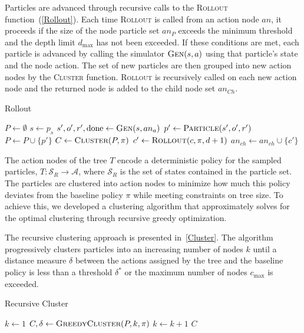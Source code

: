 \documentclass[letterpaper]{article} %
\begin{document}
Particles are advanced through recursive calls to the \textsc{Rollout} function~(\cref{Rollout}).
Each time \textsc{Rollout} is called from an action node $an$, it proceeds if the size of the node particle set $an_P$ exceeds the minimum threshold and the depth limit $d_{\max}$ has not been exceeded.
If these conditions are met, each particle is advanced by calling the simulator $\textsc{Gen}(s, a)$ using that particle's state and the node action.
The set of new particles are then grouped into new action nodes by the \textsc{Cluster} function.
\textsc{Rollout} is recursively called on each new action node and the returned node is added to the child node set $an_{Ch}$.
\begin{algorithm}[ht]
\caption{Rollout}\label{Rollout}
\begin{algorithmic}[1]
\State $P \gets \emptyset$
\State $s \gets p_s$
\State $s', o', r', \text{done} \gets \textsc{Gen}(s, an_a)$
\State $p' \gets \textsc{Particle}(s', o', r')$
\State $P \gets P \cup \{ p' \}$
\EndIf
\EndFor
\State $C \gets \textsc{Cluster}(P, \pi)$
\State $c' \gets \textsc{Rollout}(c, \pi, d + 1)$
\State $an_{ch} \gets an_{ch} \cup \{ c' \}$
\EndFor
\EndIf
\State \Return {}
\EndProcedure
\end{algorithmic}
\end{algorithm}

The action nodes of the tree $T$ encode a deterministic policy for the sampled particles, $T: \mathcal{S}_R \to \mathcal{A}$, where $\mathcal{S}_R$ is the set of states contained in the particle set.
The particles are clustered into action nodes to minimize how much this policy deviates from the baseline policy $\pi$ while meeting constraints on tree size.
To achieve this, we developed a clustering algorithm that approximately solves for the optimal clustering through recursive greedy optimization.

The recursive clustering approach is presented in~\cref{Cluster}.
The algorithm progressively clusters particles into an increasing number of nodes $k$ until a distance measure $\delta$ between the actions assigned by the tree and the baseline policy is less than a threshold $\delta^*$ or the maximum number of nodes $c_{\max}$ is exceeded.
\begin{algorithm}[ht]
\caption{Recursive Cluster}\label{Cluster}
\begin{algorithmic}[1]
\State $k \gets 1$
\Repeat
\State $C, \delta \gets \textsc{GreedyCluster}(P, k, \pi)$
\State $k \gets k + 1$
\State \Return $C$
\EndProcedure
\end{algorithmic}
\end{algorithm}
\end{document}
